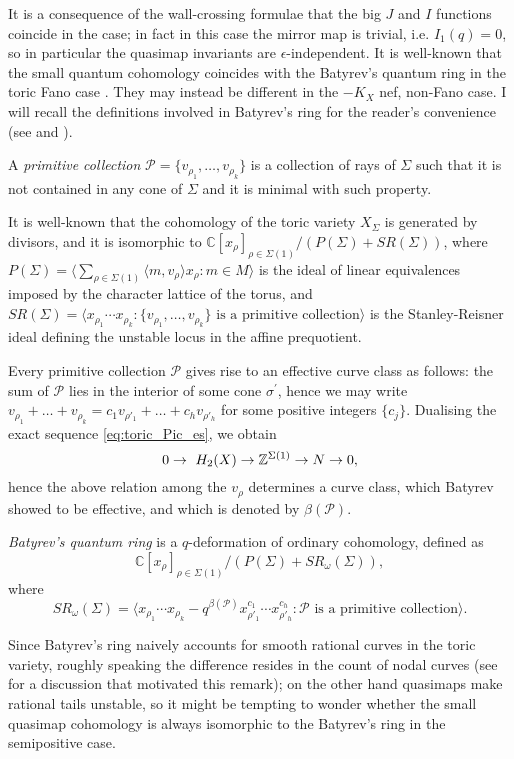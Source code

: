 It is a consequence of the wall-crossing formulae that the big $J$ and $I$ functions coincide in the  case; in fact in this case the mirror map is trivial, i.e. $I_1(q)=0$, so in particular the quasimap invariants are $\epsilon$-independent. It is well-known that the small quantum cohomology coincides with the Batyrev's quantum ring in the toric Fano case \cite[Example 11.2.5.2]{MS}. They may instead be different in the $-K_X$ nef, non-Fano case. I will recall the definitions involved in Batyrev's ring for the reader's convenience (see \cite{Batyrev} and \cite[Example 8.1.2.2]{MS}).
\begin{definition}
 A \emph{primitive collection} $\mathcal P=\{v_{\rho_1},\ldots,v_{\rho_k}\}$ is a collection of rays of $\Sigma$ such that it is not contained in any cone of $\Sigma$ and it is minimal with such property.
 
 It is well-known that the cohomology of the toric variety $X_\Sigma$ is generated by divisors, and it is isomorphic to $\mathbb C[x_\rho]_{\rho\in\Sigma(1)}/(P(\Sigma)+SR(\Sigma))$, where $P(\Sigma)=\langle \sum_{\rho\in\Sigma(1)}\langle m,v_\rho\rangle x_\rho : m\in M\rangle$ is the ideal of linear equivalences imposed by the character lattice of the torus, and $SR(\Sigma)=\langle x_{\rho_1}\cdots x_{\rho_k} : \{v_{\rho_1},\ldots,v_{\rho_k}\} \text{ is a primitive collection}\rangle$ is the Stanley-Reisner ideal defining the unstable locus in the affine prequotient.
 
 Every primitive collection $\mathcal P$ gives rise to an effective curve class as follows: the sum of $\mathcal P$ lies in the interior of some cone $\sigma^\prime$, hence we may write $v_{\rho_1}+\ldots+v_{\rho_k}=c_{1}v_{\rho'_1}+\ldots+c_{h}v_{\rho'_h}$ for some positive integers $\{c_j\}$. Dualising the exact sequence \eqref{eq:toric_Pic_es}, we obtain \[0\rightarrow\ H_2(X)\rightarrow \mathbb{Z}^{\Sigma(1)}\rightarrow N\rightarrow 0,\] hence the above relation among the $v_\rho$ determines a curve class, which Batyrev showed to be effective, and which is denoted by $\beta(\mathcal P)$.
 
 \emph{Batyrev's quantum ring} is a $q$-deformation of ordinary cohomology, defined as \[\mathbb C[x_\rho]_{\rho\in\Sigma(1)}/(P(\Sigma)+SR_\omega(\Sigma)),\] where \[SR_\omega(\Sigma)=\langle x_{\rho_1}\cdots x_{\rho_k}-q^{\beta(\mathcal P)}x_{\rho'_1}^{c_1}\cdots x_{\rho'_h}^{c_h} : \mathcal P\text{ is a primitive collection}\rangle.\]
\end{definition}

Since Batyrev's ring naively accounts for smooth rational curves in the toric variety, roughly speaking the difference resides in the count of nodal curves (see \cite{HScounting} for a discussion that motivated this remark); on the other hand quasimaps make rational tails unstable, so it might be tempting to wonder whether the small quasimap cohomology is always isomorphic to the Batyrev's ring in the semipositive case.

